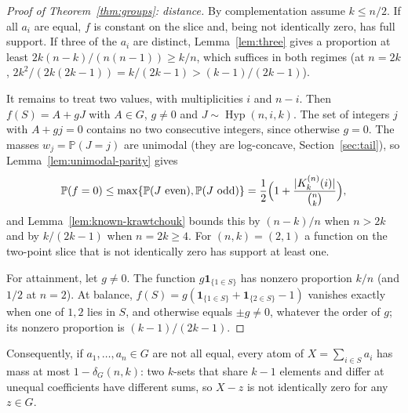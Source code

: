 \documentclass[11pt]{article}
\theoremstyle{remark}
\newcommand{\Prb}{\mathbb P}
\newcommand{\Hyp}{\operatorname{Hyp}}
\newcommand{\one}{\mathbf 1}
\begin{document}
\begin{proof}[Proof of Theorem~\ref{thm:groups}: distance]
By complementation assume \(k\le n/2\). If all \(a_i\) are equal, \(f\) is
constant on the slice and, being not identically zero, has full support. If
three of the \(a_i\) are distinct, Lemma~\ref{lem:three} gives a proportion at
least \(2k(n-k)/(n(n-1))\ge k/n\), which suffices in both regimes (at \(n=2k\),
\(2k^2/(2k(2k-1))=k/(2k-1)>(k-1)/(2k-1)\)).

It remains to treat two values, with multiplicities \(i\) and \(n-i\). Then
\(f(S)=A+gJ\) with \(A\in G\), \(g\ne0\) and \(J\sim\Hyp(n,i,k)\). The set
of integers \(j\) with \(A+gj=0\) contains no two consecutive integers, since
otherwise \(g=0\). The masses \(w_j=\Prb(J=j)\) are unimodal (they are
log-concave, Section~\ref{sec:tail}), so Lemma~\ref{lem:unimodal-parity} gives
\[
 \Prb(f=0)\le\max\{\Prb(J\ \mathrm{even}),\Prb(J\ \mathrm{odd})\}
 =\frac12\Bigl(1+\frac{|K_k^{(n)}(i)|}{\binom nk}\Bigr),
\]
and Lemma~\ref{lem:known-krawtchouk} bounds this by \((n-k)/n\) when
\(n>2k\) and by \(k/(2k-1)\) when \(n=2k\ge4\). For \((n,k)=(2,1)\) a function
on the two-point slice that is not identically zero has support at least one.

For attainment, let \(g\ne0\). The function \(g\one_{\{1\in S\}}\) has
nonzero proportion \(k/n\) (and \(1/2\) at \(n=2\)). At balance,
\(f(S)=g(\one_{\{1\in S\}}+\one_{\{2\in S\}}-1)\) vanishes exactly when one of
\(1,2\) lies in \(S\), and otherwise equals \(\pm g\ne0\), whatever the order of
\(g\); its nonzero proportion is \((k-1)/(2k-1)\).
\end{proof}

Consequently, if \(a_1,\ldots,a_n\in G\) are not all equal, every atom of
\(X=\sum_{i\in S}a_i\) has mass at most \(1-\delta_G(n,k)\): two \(k\)-sets that
share \(k-1\) elements and differ at unequal coefficients have different sums,
so \(X-z\) is not identically zero for any \(z\in G\).
\end{document}
